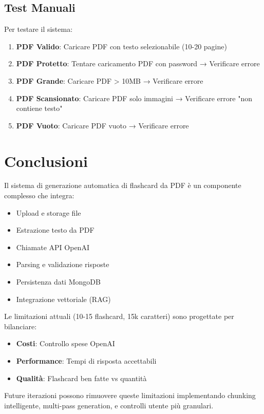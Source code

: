 \documentclass[11pt,a4paper]{article}
\begin{document}
\subsection{Test Manuali}

Per testare il sistema:

\begin{enumerate}
    \item \textbf{PDF Valido}: Caricare PDF con testo selezionabile (10-20 pagine)
    \item \textbf{PDF Protetto}: Tentare caricamento PDF con password → Verificare errore
    \item \textbf{PDF Grande}: Caricare PDF > 10MB → Verificare errore
    \item \textbf{PDF Scansionato}: Caricare PDF solo immagini → Verificare errore "non contiene testo"
    \item \textbf{PDF Vuoto}: Caricare PDF vuoto → Verificare errore
\end{enumerate}

\section{Conclusioni}

Il sistema di generazione automatica di flashcard da PDF è un componente complesso che integra:
\begin{itemize}
    \item Upload e storage file
    \item Estrazione testo da PDF
    \item Chiamate API OpenAI
    \item Parsing e validazione risposte
    \item Persistenza dati MongoDB
    \item Integrazione vettoriale (RAG)
\end{itemize}

Le limitazioni attuali (10-15 flashcard, 15k caratteri) sono progettate per bilanciare:
\begin{itemize}
    \item \textbf{Costi}: Controllo spese OpenAI
    \item \textbf{Performance}: Tempi di risposta accettabili
    \item \textbf{Qualità}: Flashcard ben fatte vs quantità
\end{itemize}

Future iterazioni possono rimuovere queste limitazioni implementando chunking intelligente, multi-pass generation, e controlli utente più granulari.
\end{document}
